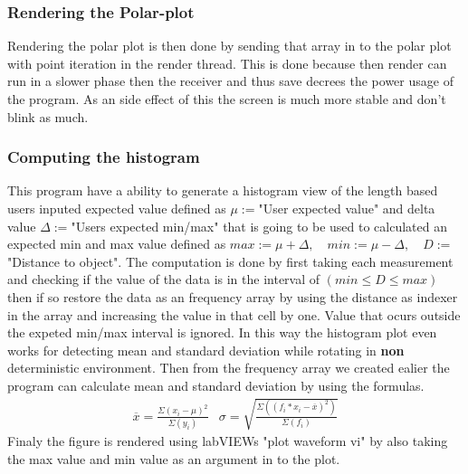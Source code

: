 \subsubsection{Rendering the Polar-plot}\label{subsubsection:renderPolar}
Rendering the polar plot is then done by sending that array in to the polar plot with point iteration\cite{labVIEW-polar-plot} in the render thread. 
This is done because then render can run in a slower phase then the receiver and thus save decrees the power usage of the program. 
As an side effect of this the screen is much more stable and don't blink as much.

\subsubsection{Computing the histogram}\label{subsubsection:comphistogram}
This program have a ability to generate a histogram view of the length based users inputed expected value defined as $\mu:=$"User expected value" and delta value $\Delta:=$"Users expected min/max" that is going to be used to calculated an expected min and max value defined as $ max:=\mu+\Delta,\quad min:=\mu-\Delta, \quad D:=$"Distance to object".
The computation is done by first taking each measurement and checking if the value of the data is in the interval of $ (min \leq D \leq max) $ then if so restore the data as an frequency array by using the distance as indexer in the array and increasing the value in that cell by one.
Value that ocurs outside the expeted min/max interval is ignored.
In this way the histogram plot even works for detecting mean and standard deviation while rotating in \textbf{non} deterministic environment.
Then from the frequency array we created ealier the program can calculate mean and standard deviation by using the formulas.
$$\begin{matrix} 
\overline{x}=\frac{\Sigma(x_i-\mu)^2}{\Sigma(y_i)} & 
\sigma= \sqrt{\frac{\Sigma((f_i*x_i-\overline{x})^2)}{\Sigma(f_i)}}
\end{matrix}\label{equation:mean-and-div}$$
Finaly the figure is rendered using labVIEWs "plot waveform vi" \cite{labVIEW-Plot-Waveform-VI} by also taking the max value and min value as an argument in to the plot. 

